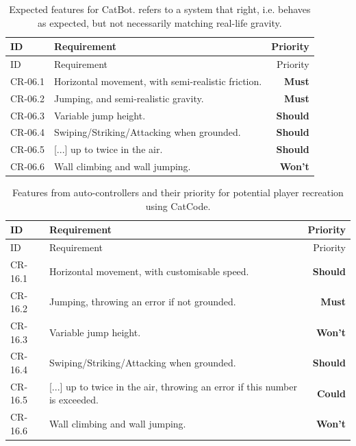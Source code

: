 \begin{center}
  \begin{longtable}{lp{9.5cm}r}
    \caption[Desired CatBot Features]{Expected features for CatBot.  refers to a system that  right, i.e. behaves as expected, but not necessarily matching real-life gravity.} \label{tab:coreRequirements/autoCatFeatures} \\
    \toprule
    ID
    & Requirement
    & Priority \\ \midrule
    \endfirsthead
    \toprule
    ID
    & Requirement
    & Priority \\ \midrule
    \endhead
    CR-06.1
    & Horizontal movement, with semi-realistic friction.
    & \textbf{Must}
    \\
    CR-06.2
    & Jumping, and semi-realistic gravity.
    & \textbf{Must}
    \\
    CR-06.3
    & Variable jump height.
    & \textbf{Should}
    \\
    CR-06.4
    & Swiping/Striking/Attacking when grounded.
    & \textbf{Should}
    \\
    CR-06.5
    & [...] up to twice in the air.
    & \textbf{Should}
    \\
    CR-06.6
    & Wall climbing and wall jumping.
    & \textbf{Won't}
    \\ 
    \bottomrule
  \end{longtable}
\end{center}

\begin{center}
  \begin{longtable}{lp{9.5cm}r}
    \caption[Features required to have CatCode equivalent]{Features from auto-controllers and their priority for potential player recreation using CatCode.} \label{tab:coreRequirements/autoCatFeaturesInCatCode} \\
    \toprule
    ID
    & Requirement
    & Priority \\ \midrule
    \endfirsthead
    \toprule
    ID
    & Requirement
    & Priority \\ \midrule
    \endhead
    CR-16.1
    & Horizontal movement, with customisable speed.
    & \textbf{Should}
    \\
    CR-16.2
    & Jumping, throwing an error if not grounded.
    & \textbf{Must}
    \\
    CR-16.3
    & Variable jump height.
    & \textbf{Won't}
    \\
    CR-16.4
    & Swiping/Striking/Attacking when grounded.
    & \textbf{Should}
    \\
    CR-16.5
    & [...] up to twice in the air, throwing an error if this number is exceeded.
    & \textbf{Could}
    \\
    CR-16.6
    & Wall climbing and wall jumping.
    & \textbf{Won't}
    \\ 
    \bottomrule
  \end{longtable}
\end{center}

